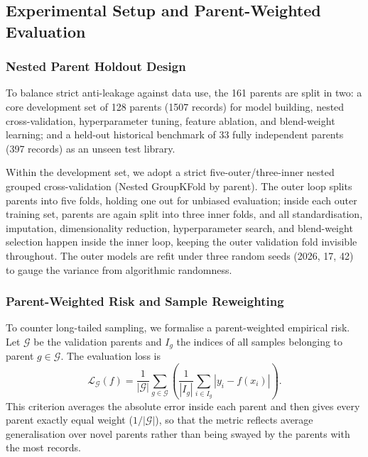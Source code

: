 \subsection{Experimental Setup and Parent-Weighted Evaluation}\label{sec:v2-experiments}

\subsubsection{Nested Parent Holdout Design}
To balance strict anti-leakage against data use, the 161 parents are split in two: a core development set of 128 parents (1507 records) for model building, nested cross-validation, hyperparameter tuning, feature ablation, and blend-weight learning; and a held-out historical benchmark of 33 fully independent parents (397 records) as an unseen test library.

Within the development set, we adopt a strict five-outer/three-inner nested grouped cross-validation (Nested GroupKFold by parent). The outer loop splits parents into five folds, holding one out for unbiased evaluation; inside each outer training set, parents are again split into three inner folds, and all standardisation, imputation, dimensionality reduction, hyperparameter search, and blend-weight selection happen inside the inner loop\cite{varma2006,cawley2010}, keeping the outer validation fold invisible throughout. The outer models are refit under three random seeds (2026, 17, 42) to gauge the variance from algorithmic randomness.

\subsubsection{Parent-Weighted Risk and Sample Reweighting}
To counter long-tailed sampling, we formalise a parent-weighted empirical risk. Let $\mathcal{G}$ be the validation parents and $I_g$ the indices of all samples belonging to parent $g \in \mathcal{G}$. The evaluation loss is
\begin{equation}\label{eq:v2-common-risk}
\mathcal{L}_{\mathcal{G}}(f) = \frac{1}{|\mathcal{G}|} \sum_{g \in \mathcal{G}} \left( \frac{1}{|I_g|} \sum_{i \in I_g} |y_i - f(x_i)| \right).
\end{equation}
This criterion averages the absolute error inside each parent and then gives every parent exactly equal weight ($1/|\mathcal{G}|$), so that the metric reflects average generalisation over novel parents rather than being swayed by the parents with the most records.

